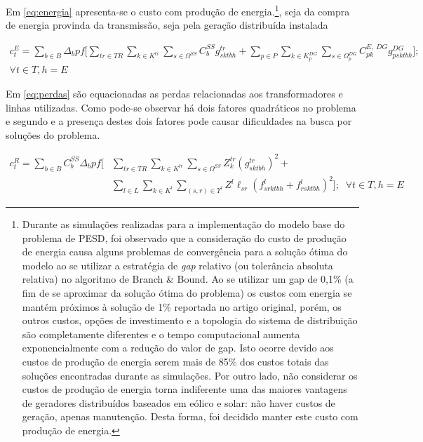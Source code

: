 Em \eqref{eq:energia} apresenta-se o custo com produção de energia.\footnote{Durante as simulações realizadas para a implementação do modelo base do problema de \ac{PESD}, foi observado que a consideração do custo de produção de energia causa alguns problemas de convergência para a solução ótima do modelo ao se utilizar a estratégia de \textit{gap} relativo (ou tolerância absoluta relativa) no algoritmo de Branch \& Bound.
Ao se utilizar um gap de 0,1\% (a fim de se aproximar da solução ótima do problema) os custos com energia se mantém próximos à solução de 1\% reportada no artigo original, porém, os outros custos, opções de investimento e a topologia do sistema de distribuição são completamente diferentes e o tempo computacional aumenta exponencialmente com a redução do valor de gap. Isto ocorre devido aos custos de produção de energia serem mais de 85\% dos custos totais das soluções encontradas durante as simulações. Por outro lado, não considerar os custos de produção de energia torna indiferente uma das maiores vantagens de geradores distribuídos baseados em eólico e solar: não haver custos de geração, apenas manutenção. Desta forma, foi decidido manter este custo com produção de energia.}, seja da compra de energia provinda da transmissão, seja pela geração distribuída instalada

\begin{align}
    c^E_t  =
    \sum_{b \in B} \Delta_b pf\bigg[
    \sum_{tr \in TR} \sum_{k \in K^{tr}} \sum_{s \in \Omega^{SS}}
    C^{SS}_b g^{tr}_{sktbh} + 
    \sum_{p \in P}\sum_{k \in K^{DG}_p} \sum_{s \in \Omega^{DG}_p} C^{E, \;DG}_{pk}  g^{DG}_{psktbh}\bigg]; \nonumber\; \;\\ \forall t \in T, h=E 
    \label{eq:energia}
\end{align}
 

Em \eqref{eq:perdas} são equacionadas as perdas relacionadas aos transformadores e linhas utilizadas. Como pode-se observar há dois fatores quadráticos no problema e segundo  e  a presença destes dois fatores pode causar dificuldades na busca por soluções do problema. 

\begin{align}
 c^R_t  =
\sum_{b \in B} C^{SS}_b \Delta_b pf \bigg[&\sum_{tr \in TR} \sum_{k \in K^{tr}} \sum_{s \in \Omega^{SS}} Z^{tr}_k (g^{tr}_{sktbh})^2  +\nonumber \\
&\sum_{l \in L} \sum_{k \in K^l} \sum_{(s, r) \in \Upsilon^l} Z^l \ell_{sr} (f^l_{srktbh} + f^l_{rsktbh})^2
\bigg]; \; \; \forall t \in T, h=E 
\label{eq:perdas}
\end{align}

